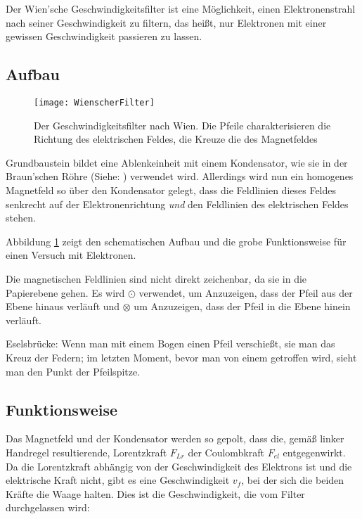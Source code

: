 Der Wien'sche Geschwindigkeitsfilter ist eine Möglichkeit, einen Elektronenstrahl nach seiner Geschwindigkeit zu filtern, das heißt, nur Elektronen mit einer gewissen Geschwindigkeit passieren zu lassen.

\subsection{Aufbau}

\begin{figure}[h!]
	\centering
	\vspace*{-10pt}
	\texttt{[image: WienscherFilter]}
	\caption{Der Geschwindigkeitsfilter nach Wien. Die Pfeile charakterisieren die Richtung des elektrischen Feldes, die Kreuze die des Magnetfeldes}
	\label{fig:Wien}
\end{figure}

Grundbaustein bildet eine Ablenkeinheit mit einem Kondensator, wie sie in der Braun'schen Röhre (Siehe: ) verwendet wird. Allerdings wird nun ein homogenes Magnetfeld so über den Kondensator gelegt, dass die Feldlinien dieses Feldes senkrecht auf der Elektronenrichtung \emph{und} den Feldlinien des elektrischen Feldes stehen.

Abbildung \ref{fig:Wien} zeigt den schematischen Aufbau und die grobe Funktionsweise für einen Versuch mit Elektronen.


\begin{Anmerkung}
	Die magnetischen Feldlinien sind nicht direkt zeichenbar, da sie \glqq in die Papierebene\grqq{} gehen. Es wird $\odot$ verwendet, um Anzuzeigen, dass der Pfeil aus der Ebene hinaus verläuft und $\otimes$ um Anzuzeigen, dass der Pfeil in die Ebene hinein verläuft.
	
	Eselsbrücke: Wenn man mit einem Bogen einen Pfeil verschießt, sie man das Kreuz der Federn; im letzten Moment, bevor man von einem getroffen wird, sieht man den Punkt der Pfeilspitze.
\end{Anmerkung}



\subsection{Funktionsweise}

Das Magnetfeld und der Kondensator werden so gepolt, dass die, gemäß linker Handregel resultierende, Lorentzkraft $F_{Lr}$ der Coulombkraft $F_{el}$ entgegenwirkt. Da die Lorentzkraft abhängig von der Geschwindigkeit des Elektrons ist und die elektrische Kraft nicht, gibt es eine Geschwindigkeit $v_f$, bei der sich die beiden Kräfte die Waage halten. Dies ist die Geschwindigkeit, die vom Filter durchgelassen wird:

